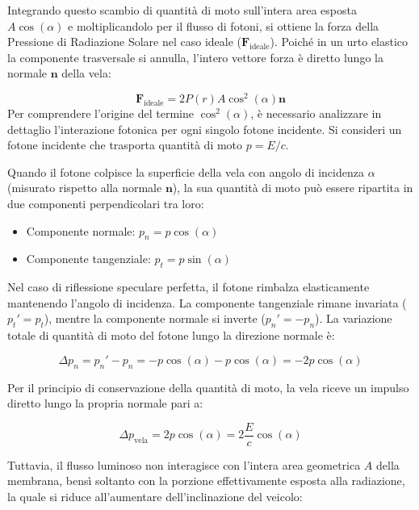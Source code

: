 Integrando questo scambio di quantità di moto sull'intera area esposta $A \cos(\alpha)$ e moltiplicandolo per il flusso di fotoni, si ottiene la forza della Pressione di Radiazione Solare nel caso ideale ($\mathbf{F}_{\text{ideale}}$). Poiché in un urto elastico la componente trasversale si annulla, l'intero vettore forza è diretto lungo la normale $\mathbf{n}$ della vela:

\begin{equation} \label{eq:srp_ideale}
    \mathbf{F}_{\text{ideale}} = 2 P(r) A \cos^2(\alpha) \mathbf{n}
\end{equation}
Per comprendere l'origine del termine $\cos^2(\alpha)$, è necessario analizzare in dettaglio l'interazione fotonica per ogni singolo fotone incidente.
Si consideri un fotone incidente che trasporta quantità di moto $p = E/c$. 

Quando il fotone colpisce la superficie della vela con angolo di incidenza $\alpha$ (misurato rispetto alla normale $\mathbf{n}$), la sua quantità di moto può essere ripartita in due componenti perpendicolari tra loro:
\begin{itemize}
    \item Componente normale: $p_n = p \cos(\alpha)$
    \item Componente tangenziale: $p_t = p \sin(\alpha)$
\end{itemize}

Nel caso di riflessione speculare perfetta, il fotone rimbalza elasticamente mantenendo l'angolo di incidenza. La componente tangenziale rimane invariata ($p_t' = p_t$), mentre la componente normale si inverte ($p_n' = -p_n$). La variazione totale di quantità di moto del fotone lungo la direzione normale è:

\begin{equation}
    \Delta p_n = p_n' - p_n = -p\cos(\alpha) - p\cos(\alpha) = -2p\cos(\alpha)
\end{equation}

Per il principio di conservazione della quantità di moto, la vela riceve un impulso diretto lungo la propria normale pari a:

\begin{equation}
    \Delta p_{\text{vela}} = 2p\cos(\alpha) = 2\frac{E}{c}\cos(\alpha)
\end{equation}

Tuttavia, il flusso luminoso non interagisce con l'intera area geometrica $A$ della membrana, bensì soltanto con la porzione effettivamente esposta alla radiazione, la quale si riduce all'aumentare dell'inclinazione del veicolo:

